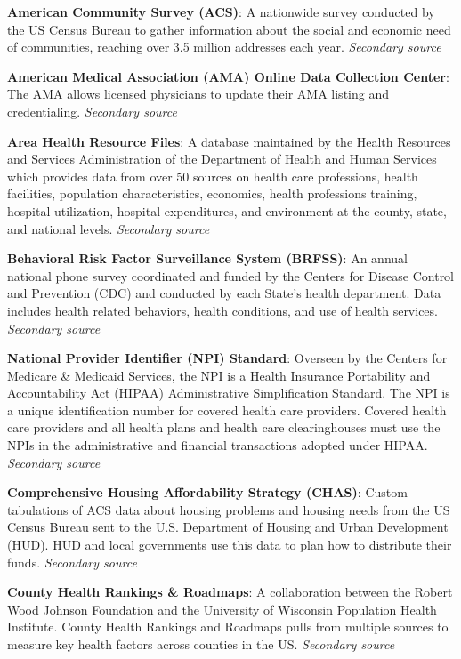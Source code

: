 \documentclass[
  english,
  letterpaper,
]{report}
\begin{document}
\textbf{American Community Survey (ACS)}: A nationwide survey conducted
by the US Census Bureau to gather information about the social and
economic need of communities, reaching over 3.5 million addresses each
year. \emph{Secondary source}

\textbf{American Medical Association (AMA) Online Data Collection
Center}: The AMA allows licensed physicians to update their AMA listing
and credentialing. \emph{Secondary source}

\textbf{Area Health Resource Files}: A database maintained by the Health
Resources and Services Administration of the Department of Health and
Human Services which provides data from over 50 sources on health care
professions, health facilities, population characteristics, economics,
health professions training, hospital utilization, hospital
expenditures, and environment at the county, state, and national levels.
\emph{Secondary source}

\textbf{Behavioral Risk Factor Surveillance System (BRFSS)}: An annual
national phone survey coordinated and funded by the Centers for Disease
Control and Prevention (CDC) and conducted by each State's health
department. Data includes health related behaviors, health conditions,
and use of health services. \emph{Secondary source}

\textbf{National Provider Identifier (NPI) Standard}: Overseen by the
Centers for Medicare \& Medicaid Services, the NPI is a Health Insurance
Portability and Accountability Act (HIPAA) Administrative Simplification
Standard. The NPI is a unique identification number for covered health
care providers. Covered health care providers and all health plans and
health care clearinghouses must use the NPIs in the administrative and
financial transactions adopted under HIPAA. \emph{Secondary source}

\textbf{Comprehensive Housing Affordability Strategy (CHAS)}: Custom
tabulations of ACS data about housing problems and housing needs from
the US Census Bureau sent to the U.S. Department of Housing and Urban
Development (HUD). HUD and local governments use this data to plan how
to distribute their funds. \emph{Secondary source}

\textbf{County Health Rankings \& Roadmaps}: A collaboration between the
Robert Wood Johnson Foundation and the University of Wisconsin
Population Health Institute. County Health Rankings and Roadmaps pulls
from multiple sources to measure key health factors across counties in
the US. \emph{Secondary source}
\end{document}
